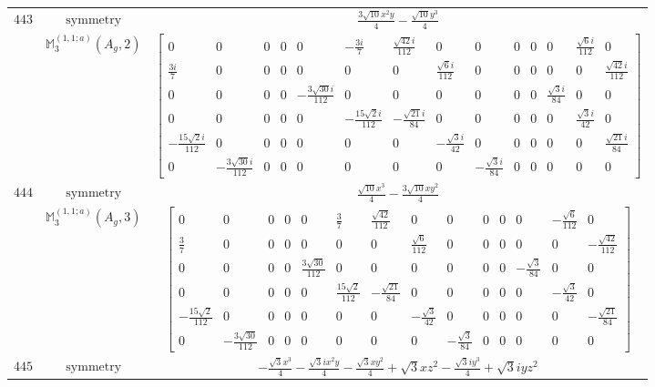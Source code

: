 \documentclass[fleqn,8pt,landscape]{jsarticle}
\begin{document}
\begin{longtable}{ccc}
$ 443 $ & $ \text{symmetry} $ & $ \frac{3 \sqrt{10} x^{2} y}{4} - \frac{\sqrt{10} y^{3}}{4} $ \\
$  $ & $ \mathbb{M}_{3}^{(1,1;a)}(A_{g},2) $ & $ \begin{bmatrix} 0 & 0 & 0 & 0 & 0 & - \frac{3 i}{7} & \frac{\sqrt{42} i}{112} & 0 & 0 & 0 & 0 & 0 & \frac{\sqrt{6} i}{112} & 0 \\ \frac{3 i}{7} & 0 & 0 & 0 & 0 & 0 & 0 & \frac{\sqrt{6} i}{112} & 0 & 0 & 0 & 0 & 0 & \frac{\sqrt{42} i}{112} \\ 0 & 0 & 0 & 0 & - \frac{3 \sqrt{30} i}{112} & 0 & 0 & 0 & 0 & 0 & 0 & \frac{\sqrt{3} i}{84} & 0 & 0 \\ 0 & 0 & 0 & 0 & 0 & - \frac{15 \sqrt{2} i}{112} & - \frac{\sqrt{21} i}{84} & 0 & 0 & 0 & 0 & 0 & \frac{\sqrt{3} i}{42} & 0 \\ - \frac{15 \sqrt{2} i}{112} & 0 & 0 & 0 & 0 & 0 & 0 & - \frac{\sqrt{3} i}{42} & 0 & 0 & 0 & 0 & 0 & \frac{\sqrt{21} i}{84} \\ 0 & - \frac{3 \sqrt{30} i}{112} & 0 & 0 & 0 & 0 & 0 & 0 & - \frac{\sqrt{3} i}{84} & 0 & 0 & 0 & 0 & 0 \end{bmatrix} $ \\ \hline
$ 444 $ & $ \text{symmetry} $ & $ \frac{\sqrt{10} x^{3}}{4} - \frac{3 \sqrt{10} x y^{2}}{4} $ \\
$  $ & $ \mathbb{M}_{3}^{(1,1;a)}(A_{g},3) $ & $ \begin{bmatrix} 0 & 0 & 0 & 0 & 0 & \frac{3}{7} & \frac{\sqrt{42}}{112} & 0 & 0 & 0 & 0 & 0 & - \frac{\sqrt{6}}{112} & 0 \\ \frac{3}{7} & 0 & 0 & 0 & 0 & 0 & 0 & \frac{\sqrt{6}}{112} & 0 & 0 & 0 & 0 & 0 & - \frac{\sqrt{42}}{112} \\ 0 & 0 & 0 & 0 & \frac{3 \sqrt{30}}{112} & 0 & 0 & 0 & 0 & 0 & 0 & - \frac{\sqrt{3}}{84} & 0 & 0 \\ 0 & 0 & 0 & 0 & 0 & \frac{15 \sqrt{2}}{112} & - \frac{\sqrt{21}}{84} & 0 & 0 & 0 & 0 & 0 & - \frac{\sqrt{3}}{42} & 0 \\ - \frac{15 \sqrt{2}}{112} & 0 & 0 & 0 & 0 & 0 & 0 & - \frac{\sqrt{3}}{42} & 0 & 0 & 0 & 0 & 0 & - \frac{\sqrt{21}}{84} \\ 0 & - \frac{3 \sqrt{30}}{112} & 0 & 0 & 0 & 0 & 0 & 0 & - \frac{\sqrt{3}}{84} & 0 & 0 & 0 & 0 & 0 \end{bmatrix} $ \\ \hline
$ 445 $ & $ \text{symmetry} $ & $ - \frac{\sqrt{3} x^{3}}{4} - \frac{\sqrt{3} i x^{2} y}{4} - \frac{\sqrt{3} x y^{2}}{4} + \sqrt{3} x z^{2} - \frac{\sqrt{3} i y^{3}}{4} + \sqrt{3} i y z^{2} $ \\

\end{longtable}
\end{document}
